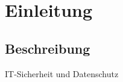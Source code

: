 \section{Einleitung}
\label{sec:Einleitung}


\subsection{Beschreibung} 
\label{sec:ITSBeschreibung}
IT-Sicherheit und Datenschutz
